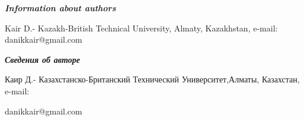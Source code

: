\emph{{\bfseries Information about authors}}

\begin{noparindent}
Kair D.- Kazakh-British Technical University, Almaty, Kazakhstan,
e-mail: danikkair@gmail.com
\end{noparindent}

\emph{{\bfseries Сведения об авторе}}

\begin{noparindent}
Каир Д.- Казахстанско-Британский Технический Университет,Алматы,
Казахстан, e-mail:

danikkair@gmail.com
\end{noparindent}
